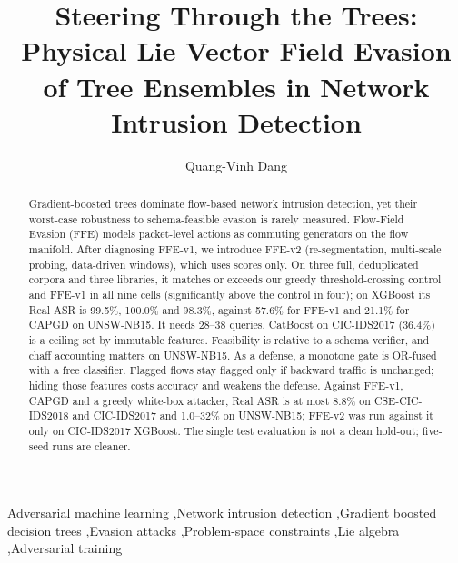 \documentclass[review,12pt]{elsarticle}
\theoremstyle{plain}
\theoremstyle{definition}
\theoremstyle{remark}
\begin{document}
\begin{frontmatter}

\title{Steering Through the Trees: Physical Lie Vector Field Evasion of Tree Ensembles in Network Intrusion Detection}

\author[inst1]{Quang-Vinh Dang}

\begin{abstract}
Gradient-boosted trees dominate flow-based network intrusion detection, yet their worst-case robustness to schema-feasible evasion is rarely measured. Flow-Field Evasion (FFE) models packet-level actions as commuting generators on the flow manifold. After diagnosing FFE-v1, we introduce FFE-v2 (re-segmentation, multi-scale probing, data-driven windows), which uses scores only. On three full, deduplicated corpora and three libraries, it matches or exceeds our greedy threshold-crossing control and FFE-v1 in all nine cells (significantly above the control in four); on XGBoost its Real ASR is 99.5\%, 100.0\% and 98.3\%, against 57.6\% for FFE-v1 and 21.1\% for CAPGD on UNSW-NB15. It needs 28--38 queries. CatBoost on CIC-IDS2017 (36.4\%) is a ceiling set by immutable features. Feasibility is relative to a schema verifier, and chaff accounting matters on UNSW-NB15. As a defense, a monotone gate is OR-fused with a free classifier. Flagged flows stay flagged only if backward traffic is unchanged; hiding those features costs accuracy and weakens the defense. Against FFE-v1, CAPGD and a greedy white-box attacker, Real ASR is at most 8.8\% on CSE-CIC-IDS2018 and CIC-IDS2017 and 1.0--32\% on UNSW-NB15; FFE-v2 was run against it only on CIC-IDS2017 XGBoost. The single test evaluation is not a clean hold-out; five-seed runs are cleaner.
\end{abstract}

\begin{keyword}
Adversarial machine learning \sep Network intrusion detection \sep Gradient boosted decision trees \sep Evasion attacks \sep Problem-space constraints \sep Lie algebra \sep Adversarial training
\end{keyword}

\end{frontmatter}

\sloppy



\end{document}
